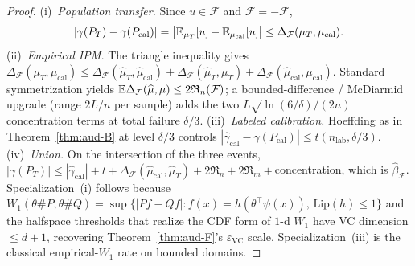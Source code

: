 \begin{proof}
(i)~\emph{Population transfer.} Since $u\in\mathcal F$ and $\mathcal F=-\mathcal F$,
\[
|\gamma(P_T)-\gamma(P_{\mathrm{cal}})|
=\bigl|\mathbb{E}_{\mu_T}[u]-\mathbb{E}_{\mu_{\mathrm{cal}}}[u]\bigr|
\le\Delta_{\mathcal F}(\mu_T,\mu_{\mathrm{cal}}).
\]
(ii)~\emph{Empirical IPM.} The triangle inequality gives
$\Delta_{\mathcal F}(\mu_T,\mu_{\mathrm{cal}})
\le\Delta_{\mathcal F}(\widehat\mu_T,\widehat\mu_{\mathrm{cal}})
+\Delta_{\mathcal F}(\widehat\mu_T,\mu_T)
+\Delta_{\mathcal F}(\widehat\mu_{\mathrm{cal}},\mu_{\mathrm{cal}})$.
Standard symmetrization yields
$\mathbb{E}\Delta_{\mathcal F}(\widehat\mu,\mu)\le 2\mathfrak R_n(\mathcal F)$; a bounded-difference /
McDiarmid upgrade (range $2L/n$ per sample) adds the two
$L\sqrt{\ln(6/\delta)/(2n)}$ concentration terms at total failure $\delta/3$.
(iii)~\emph{Labeled calibration.} Hoeffding as in Theorem~\ref{thm:aud-B} at level $\delta/3$
controls $|\widehat\gamma_{\mathrm{cal}}-\gamma(P_{\mathrm{cal}})|\le t(n_{\mathrm{lab}},\delta/3)$.
(iv)~\emph{Union.} On the intersection of the three events,
$|\gamma(P_T)|\le|\widehat\gamma_{\mathrm{cal}}|+t+\Delta_{\mathcal F}(\widehat\mu_{\mathrm{cal}},\widehat\mu_T)
+2\mathfrak R_n+2\mathfrak R_m+$concentration, which is $\widehat\beta_{\mathcal F}$.
Specialization~(i) follows because $W_1(\theta\#P,\theta\#Q)=\sup\{|Pf-Qf|:f(x)=h(\theta^\top\psi(x)),\,\mathrm{Lip}(h)\le1\}$
and the halfspace thresholds that realize the CDF form of $1$-d $W_1$ have VC dimension
$\le d+1$, recovering Theorem~\ref{thm:aud-F}'s $\varepsilon_{\mathrm{VC}}$ scale.
Specialization~(iii) is the classical empirical-$W_1$ rate on bounded domains.
\end{proof}


